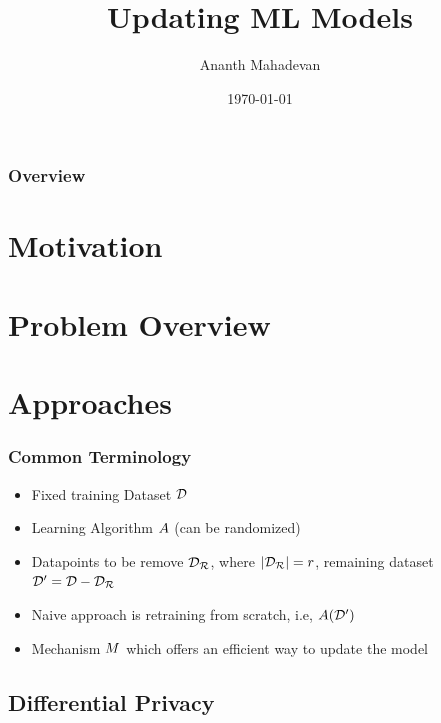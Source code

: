 \documentclass[pdf]{beamer}
\title{Updating ML Models}
\author[Ananth Mahadevan]{Ananth Mahadevan}
\date{\today}
\begin{document}
\begin{frame}
    \titlepage
\end{frame}

\begin{frame}
    \frametitle{Overview}
    \tableofcontents
\end{frame}

\section{Motivation}

\section{Problem Overview}

\section{Approaches}
\begin{frame}
  \frametitle{}
  \myNset[6]
  \smartart
\end{frame}

\begin{frame}
  \frametitle{Common Terminology}
  \begin{itemize}
    \item Fixed training Dataset $\mathcal{D}$
    \item Learning Algorithm $A$ (can be randomized)
    \item Datapoints to be remove $\mathcal{D_{R}}$, where $|\mathcal{D_{R}}|=r$, remaining dataset $\mathcal{D}^{\prime}=\mathcal{D} - \mathcal{D_{R}}$
    \item Naive approach is retraining from scratch, i.e, $A(\mathcal{D}^{\prime})$
    \item Mechanism $M$ which offers an efficient way to update the model
  \end{itemize}
\end{frame}

\subsection{Differential Privacy}
\begin{frame}
  \myNset[1]
  \smartart
\end{frame}
\end{document}
